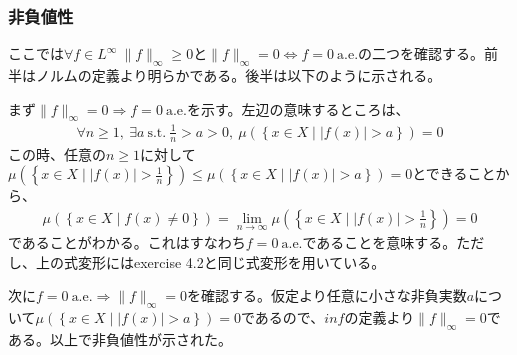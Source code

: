 \documentclass{article}
\begin{document}
\subsubsection{非負値性}

ここでは$\forall f \in L^{\infty}\ \| f \|_{\infty} \geq 0$と$\| f \|_{\infty} = 0 \Leftrightarrow f=0\ \text{a.e.}$の二つを確認する。前半はノルムの定義より明らかである。後半は以下のように示される。

まず$\| f \|_{\infty} = 0 \Rightarrow f=0\ \text{a.e.}$を示す。左辺の意味するところは、
\begin{align*}
	\forall n \geq 1,\ \exists a\ \text{s.t.}\ \frac{1}{n} > a > 0,\ \mu(\left\{ x\in X \mid | f(x)| > a \right\}) = 0
\end{align*}
この時、任意の$n \geq 1$に対して$\mu(\left\{ x\in X \mid |f(x)| > \frac{1}{n} \right\}) \leq \mu(\left\{ x\in X \mid | f(x)| > a \right\}) = 0$とできることから、
\begin{align*}
	\mu(\left\{ x\in X \mid f(x) \neq 0 \right\}) = \lim_{n\to \infty} \mu(\left\{ x\in X \mid |f(x)| > \frac{1}{n} \right\}) = 0
\end{align*}
であることがわかる。これはすなわち$f=0\ \text{a.e.}$であることを意味する。ただし、上の式変形にはexercise 4.2と同じ式変形を用いている。

次に$f=0\ \text{a.e.} \Rightarrow \| f \|_{\infty} = 0$を確認する。仮定より任意に小さな非負実数$a$について$\mu(\left\{ x\in X \mid |f(x)| > a \right\}) = 0$であるので、$inf$の定義より$\| f \|_{\infty} = 0$である。以上で非負値性が示された。
\end{document}
